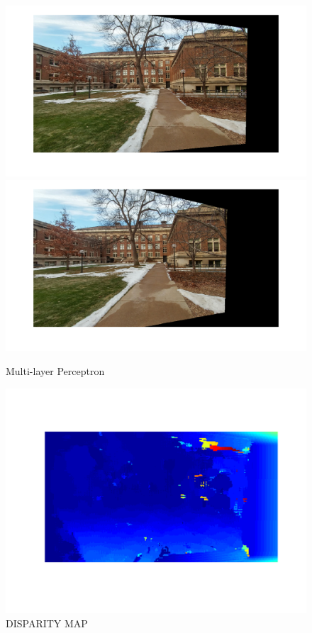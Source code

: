 \documentclass[letter, 10pt]{article}
\begin{document}
\begin{figure}[H]
        \centering
        \includegraphics[width=\textwidth]{HW5/RESULT/im1_w.png}
    \endminipage\hfill
        \centering
        \includegraphics[width=\textwidth]{HW5/RESULT/im2_w.png}
    \endminipage\hfill
    \caption{Multi-layer Perceptron}
\end{figure}

\begin{figure}[H]
    \centering
    \includegraphics[width=\textwidth]{HW5/RESULT/disp.png}
    \caption{DISPARITY MAP}
    \label{fig:my_label}
\end{figure}
\end{document}
